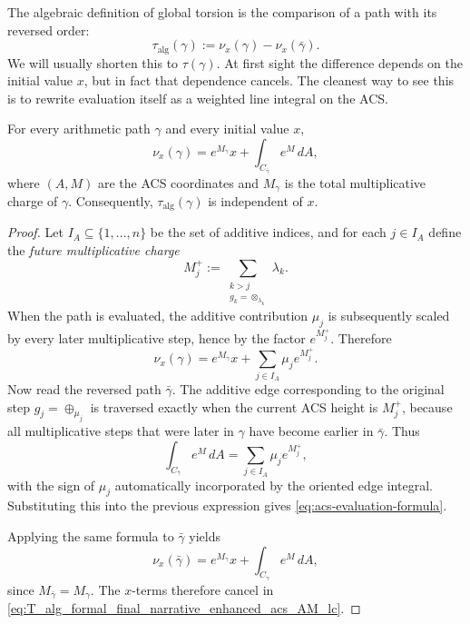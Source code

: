 The algebraic definition of global torsion is the comparison of a path with its reversed order:
\begin{equation}
    \tau_{\mathrm{alg}}(\gamma)
    := \nu_x(\gamma)-\nu_x(\bar\gamma).
    \label{eq:T_alg_formal_final_narrative_enhanced_acs_AM_lc}
\end{equation}
We will usually shorten this to $\tau(\gamma)$. At first sight the difference depends on the initial value $x$, but in fact that dependence cancels. The cleanest way to see this is to rewrite evaluation itself as a weighted line integral on the ACS.

\begin{proposition}\label{prop:acs-evaluation-formula}
For every arithmetic path $\gamma$ and every initial value $x$,
\begin{equation}
    \nu_x(\gamma)=e^{M_\gamma}x+\int_{C_{\bar\gamma}} e^M\,dA,
    \label{eq:acs-evaluation-formula}
\end{equation}
where $(A,M)$ are the ACS coordinates and $M_\gamma$ is the total multiplicative charge of $\gamma$. Consequently, $\tau_{\mathrm{alg}}(\gamma)$ is independent of $x$.
\end{proposition}

\begin{proof}
Let $I_A\subseteq\{1,\dots,n\}$ be the set of additive indices, and for each $j\in I_A$ define the \emph{future multiplicative charge}
\[
    M_j^{+}:=\sum_{\substack{k>j\\ g_k=\otimes_{\lambda_k}}}\lambda_k.
\]
When the path is evaluated, the additive contribution $\mu_j$ is subsequently scaled by every later multiplicative step, hence by the factor $e^{M_j^{+}}$. Therefore
\[
    \nu_x(\gamma)=e^{M_\gamma}x+\sum_{j\in I_A}\mu_j e^{M_j^{+}}.
\]
Now read the reversed path $\bar\gamma$. The additive edge corresponding to the original step $g_j=\oplus_{\mu_j}$ is traversed exactly when the current ACS height is $M_j^{+}$, because all multiplicative steps that were later in $\gamma$ have become earlier in $\bar\gamma$. Thus
\[
    \int_{C_{\bar\gamma}} e^M\,dA = \sum_{j\in I_A}\mu_j e^{M_j^{+}},
\]
with the sign of $\mu_j$ automatically incorporated by the oriented edge integral. Substituting this into the previous expression gives \eqref{eq:acs-evaluation-formula}.

Applying the same formula to $\bar\gamma$ yields
\[
    \nu_x(\bar\gamma)=e^{M_\gamma}x+\int_{C_\gamma} e^M\,dA,
\]
since $M_{\bar\gamma}=M_\gamma$. The $x$-terms therefore cancel in \eqref{eq:T_alg_formal_final_narrative_enhanced_acs_AM_lc}.
\end{proof}

